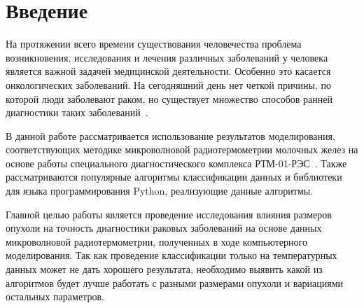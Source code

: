 \newpage
\section{Введение}
На протяжении всего времени существования человечества проблема возникновения, исследования и лечения различных заболеваний у человека является важной задачей медицинской деятельности. Особенно это касается онкологических заболеваний. На сегодняшний день нет четкой причины, по которой люди заболевают раком, но существует множество способов ранней диагностики таких заболеваний~\cite{fear2000}.
\par В данной работе рассматривается использование результатов моделирования, соответствующих методике микроволновой радиотермометрии молочных желез на основе работы специального диагностического комплекса РТМ-01-РЭС~\cite{problemiIzmereniyaVolsu}. Также рассматриваются популярные алгоритмы классификации данных и библиотеки для языка программирования Python, реализующие данные алгоритмы.
\par Главной целью работы является проведение исследования влияния размеров опухоли на точность  диагностики раковых заболеваний на основе данных микроволновой радиотермометрии, полученных в ходе компьютерного моделирования. Так как проведение классификации только на температурных данных может не дать хорошего результата, необходимо выявить какой из алгоритмов будет лучше работать с разными размерами опухоли и вариациями остальных параметров.
